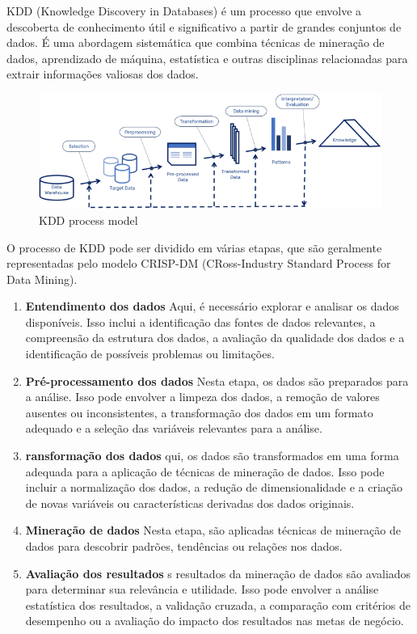 \documentclass[tcc2]{classe_uftex/uftex}
\begin{document}
KDD (Knowledge Discovery in Databases) é um processo que envolve a descoberta de conhecimento útil e significativo a partir de grandes conjuntos de dados. É uma abordagem sistemática que combina técnicas de mineração de dados, aprendizado de máquina, estatística e outras disciplinas relacionadas para extrair informações valiosas dos dados.



\begin{figure}[h]
    \centering
    \includegraphics[width=12cm]{tcc_example/42979_2020_117_Fig3_HTML.png}
    \caption{KDD process model\cite{rotondo2020evolution}}
\end{figure}

O processo de KDD pode ser dividido em várias etapas\cite{marban2009data}, que são geralmente representadas pelo modelo CRISP-DM (CRoss-Industry Standard Process for Data Mining).

\begin{enumerate}
    \item \textbf{Entendimento dos dados}
    Aqui, é necessário explorar e analisar os dados disponíveis. Isso inclui a identificação das fontes de dados relevantes, a compreensão da estrutura dos dados, a avaliação da qualidade dos dados e a identificação de possíveis problemas ou limitações. 


 \item \textbf{Pré-processamento dos dados}
   Nesta etapa, os dados são preparados para a análise. Isso pode envolver a limpeza dos dados, a remoção de valores ausentes ou inconsistentes, a transformação dos dados em um formato adequado e a seleção das variáveis relevantes para a análise.
    
    \item \textbf{ransformação dos dados}
  qui, os dados são transformados em uma forma adequada para a aplicação de técnicas de mineração de dados. Isso pode incluir a normalização dos dados, a redução de dimensionalidade e a criação de novas variáveis ou características derivadas dos dados originais.

    \item \textbf{Mineração de dados}
  Nesta etapa, são aplicadas técnicas de mineração de dados para descobrir padrões, tendências ou relações nos dados. 

      \item \textbf{Avaliação dos resultados}
  s resultados da mineração de dados são avaliados para determinar sua relevância e utilidade. Isso pode envolver a análise estatística dos resultados, a validação cruzada, a comparação com critérios de desempenho ou a avaliação do impacto dos resultados nas metas de negócio. 



\end{enumerate}
\end{document}
